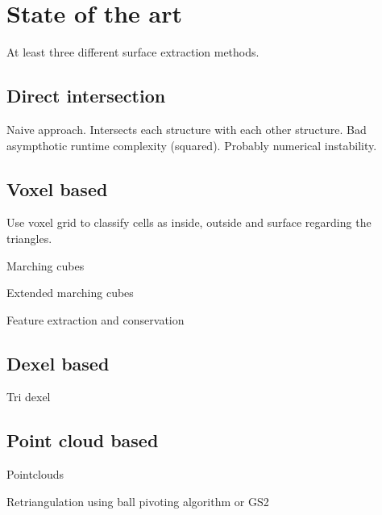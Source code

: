 
\section{State of the art}



At least three different surface extraction methods.

\subsection{Direct intersection}
Naive approach. Intersects each structure with each other structure. Bad asympthotic runtime complexity (squared). Probably numerical instability.



\subsection{Voxel based}

Use voxel grid to classify cells as inside, outside and surface regarding the triangles.

Marching cubes

Extended marching cubes

Feature extraction and conservation



\subsection{Dexel based}

Tri dexel

\subsection{Point cloud based}


Pointclouds

Retriangulation using ball pivoting algorithm or GS2